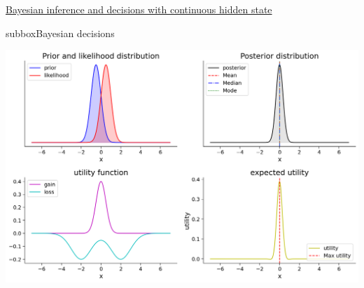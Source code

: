 \begin{textbox}{\href{https://compneuro.neuromatch.io/tutorials/W3D1_BayesianDecisions/student/W3D1_Tutorial2.html}{Bayesian inference and decisions with continuous hidden state } }
\begin{subbox}{subbox}{Bayesian decisions}
\begin{center}
\includegraphics[scale=0.23]{Figures/BD/BD_Figure13.png}
\end{center}

\end{subbox}
\end{textbox}

